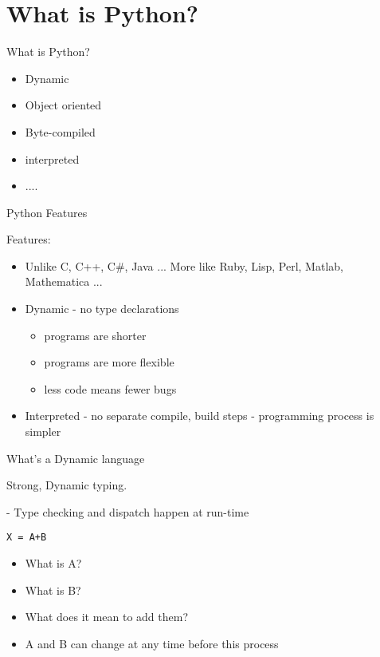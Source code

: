 \documentclass{beamer}
\begin{document}
\section{What is Python?}

\begin{frame}{What is Python?}
    \begin{itemize}
      \item Dynamic
      \item Object oriented
      \item Byte-compiled
      \item interpreted
      \item ....
    \end{itemize}
\end{frame}


\begin{frame}{Python Features}

{\Large Features:}

\begin{itemize}
  \item  Unlike C, C++, C\#, Java ... More like Ruby, Lisp, Perl, Matlab, Mathematica ...
  \item  Dynamic - no type declarations
    \begin{itemize}
      \item programs are shorter
      \item programs are more flexible
      \item less code means fewer bugs
    \end{itemize}
  \item  Interpreted - no separate compile, build steps - programming process is simpler
\end{itemize}

\end{frame}

\begin{frame}[fragile]{What's a Dynamic language}

{Strong, Dynamic typing.}

 - Type checking and dispatch happen at run-time

\vspace{0.25in}
{\Large \verb!X = A+B!}
\vspace{0.1in}
\begin{itemize}
\pause
  \item What is A?
  \item What is B?
  \item What does it mean to add them?
\vspace{0.2in}
\pause
  \item A and B can change at any time before this process
\end{itemize}

\end{frame} 
\end{document}
